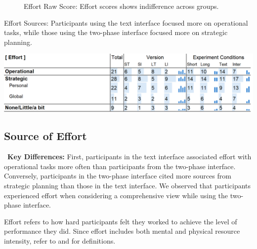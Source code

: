 \begin{figure}[h]
\begin{minipage}[t]{0.45\textwidth}
        \captionsetup{width=0.9\textwidth, justification=justified} %
        \caption{Effort Raw Score: Effort scores shows indifference across groups.}
        \label{fig:effort_cog_score}
    \end{minipage}
\end{figure}

\begin{table}[h]
    \caption{Effort Sources: Participants using the text interface focused more on operational tasks, while those using the two-phase interface focused more on strategic planning.}
    \label{tbl:physical}
    \includegraphics[width=\linewidth]{content/image/cog/effort_table.png}
\end{table}


\subsection{Source of Effort}
\label{sec:effort}

\begin{tldrbox}
   \faKey~\textbf{Key Differences:} First, participants in the text interface associated effort with operational tasks more often than participants from the two-phase interface. Conversely, participants in the two-phase interface cited more sources from strategic planning than those in the text interface. We observed that participants experienced effort when considering a comprehensive view while using the two-phase interface.
   
\end{tldrbox}
Effort refers to how hard participants felt they worked to achieve the level of performance they did. Since effort includes both mental and physical resource intensity, refer to  and  for definitions.

